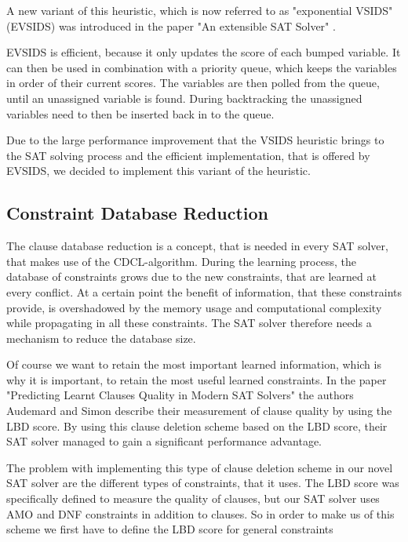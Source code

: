 A new variant of this heuristic, which is now referred to as "exponential VSIDS" (EVSIDS) \cite{biere2015evaluating} was introduced in the paper "An extensible SAT Solver" \cite{een2003extensible}. 

EVSIDS is efficient, because it only updates the score of each bumped variable. It can then be used in combination with a priority queue, which keeps the variables in order of their current scores. The variables are then polled from the queue, until an unassigned variable is found. During backtracking the unassigned variables need to then be inserted back in to the queue. \cite{biere2015evaluating}

Due to the large performance improvement that the VSIDS heuristic brings to the SAT solving process and the efficient implementation,  that is offered by EVSIDS, we decided to implement this variant of the heuristic.

\subsection{Constraint Database Reduction}

The clause database reduction is a concept, that is needed in every SAT solver, that makes use of the CDCL-algorithm. During the learning process, the database of constraints grows due to the new constraints, that are learned at every conflict. At a certain point the benefit of information, that these constraints provide, is overshadowed by the memory usage and computational complexity while propagating in all these constraints. The SAT solver therefore needs a mechanism to reduce the database size. \cite{biere2009handbook}

Of course we want to retain the most important learned information, which is why it is important, to retain the most useful learned constraints. In the paper "Predicting Learnt Clauses Quality in Modern SAT Solvers" \cite{audemard2009predicting} the authors Audemard and Simon describe their measurement of clause quality by using the LBD score. By using this clause deletion scheme based on the LBD score, their SAT solver managed to gain a significant performance advantage.

The problem with implementing this type of clause deletion scheme in our novel SAT solver are the different types of constraints, that it uses. The LBD score was specifically defined to measure the quality of clauses, but our SAT solver uses AMO and DNF constraints in addition to clauses. So in order to make us of this scheme we first have to define the LBD score for general constraints

